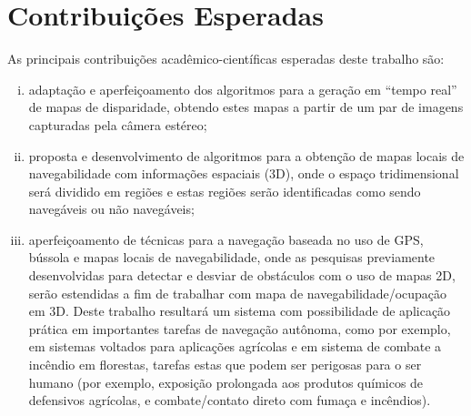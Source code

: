 \section{Contribuições Esperadas}

As principais contribuições acadêmico-científicas esperadas deste trabalho são: 

\begin{enumerate}[i.]

\item adaptação e aperfeiçoamento dos algoritmos para a geração em “tempo real”
de mapas de disparidade, obtendo estes mapas a partir de um par de imagens
capturadas pela câmera estéreo;

\item proposta e desenvolvimento de algoritmos para a obtenção de mapas locais
de navegabilidade com informações espaciais (3D), onde o espaço tridimensional
será dividido em regiões e estas regiões serão identificadas como sendo
navegáveis ou não navegáveis;

\item aperfeiçoamento de técnicas para a navegação baseada no uso de GPS,
bússola e mapas locais de navegabilidade, onde as pesquisas previamente
desenvolvidas para detectar e desviar de obstáculos com o uso de mapas 2D, serão
estendidas a fim de trabalhar com mapa de navegabilidade/ocupação em 3D. Deste
trabalho resultará um sistema com possibilidade de aplicação prática em
importantes tarefas de navegação autônoma, como por exemplo, em sistemas
voltados para aplicações agrícolas e em sistema de combate a incêndio em
florestas, tarefas estas que podem ser perigosas para o ser humano (por exemplo,
exposição prolongada aos produtos químicos de defensivos agrícolas, e
combate/contato direto com fumaça e incêndios).

\end{enumerate}
